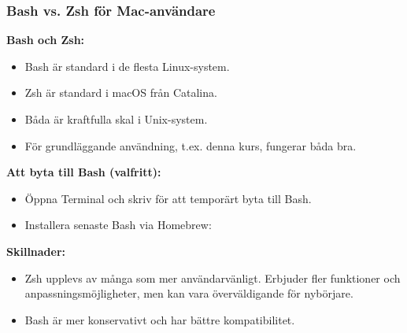 \begin{frame}[fragile=singleslide]
    \frametitle{Bash vs. Zsh för Mac-användare}

    \textbf{Bash och Zsh:}
    \begin{itemize}
        \item Bash är standard i de flesta Linux-system.
        \item Zsh är standard i macOS från Catalina.
        \item Båda är kraftfulla skal i Unix-system.
        \item För grundläggande användning, t.ex. denna kurs, fungerar båda bra.
    \end{itemize}

    \textbf{Att byta till Bash (valfritt):}
    \begin{itemize}
        \item Öppna Terminal och skriv  för att temporärt byta till Bash.
        \item Installera senaste Bash via Homebrew: 
    \end{itemize}

    \textbf{Skillnader:}
    \begin{itemize}
        \item Zsh upplevs av många som mer användarvänligt. Erbjuder fler funktioner och anpassningsmöjligheter, men kan vara överväldigande för nybörjare.
        \item Bash är mer konservativt och har bättre kompatibilitet.
    \end{itemize}

\end{frame}


